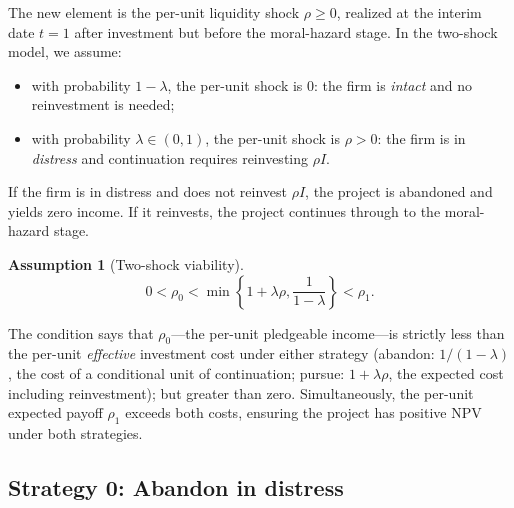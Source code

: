 \documentclass[11pt,a4paper,oneside]{book}
\def\geq{\geqslant}
\theoremstyle{plain}
\theoremstyle{definition}
\newtheorem{assumption}[theorem]{Assumption}
\theoremstyle{remark}
\numberwithin{equation}{chapter}
\begin{document}
The new element is the per-unit liquidity shock $\rho \geq 0$, realized at the interim date $t=1$ after investment but before the moral-hazard stage.
In the two-shock model, we assume:
\begin{itemize}
  \item with probability $1-\lambda$, the per-unit shock is $0$: the firm is \emph{intact} and no reinvestment is needed;
  \item with probability $\lambda \in (0,1)$, the per-unit shock is $\rho > 0$: the firm is in \emph{distress} and continuation requires reinvesting $\rho I$.
\end{itemize}
If the firm is in distress and does not reinvest $\rho I$, the project is abandoned and yields zero income.
If it reinvests, the project continues through to the moral-hazard stage.

\begin{assumption}[Two-shock viability]\label{ass:LS-2shock}
\begin{equation}\label{eq:LS-2shock-assumption}
  0 < \rho_0 < \min\left\{1 + \lambda \rho, \frac{1}{1-\lambda}\right\} < \rho_1.
\end{equation}
\end{assumption}

The condition says that $\rho_0$---the per-unit pledgeable income---is strictly less than the per-unit \emph{effective} investment cost under either strategy (abandon: $1/(1-\lambda)$, the cost of a conditional unit of continuation; pursue: $1+\lambda\rho$, the expected cost including reinvestment); but greater than zero.
Simultaneously, the per-unit expected payoff $\rho_1$ exceeds both costs, ensuring the project has positive NPV under both strategies.

\subsection{Strategy 0: Abandon in distress}
\end{document}
